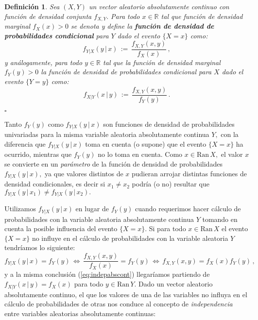 \documentclass[spanish,10pt,letterpaper]{article}
\newtheorem{defi}{Definición}
\newcommand{\Runo}{\mathbb{R}}
\newcommand{\qed}{\begin{flushright}$\square$\end{flushright}}
\begin{document}
\begin{defi}\label{def:fdpcond2}
    Sea $(X,Y)$ un vector aleatorio absolutamente continuo con función de densidad conjunta $f_{X,Y}.$ Para todo $x\in\Runo$ tal que función de densidad marginal $f_X(x)>0$ se denota y define la \textbf{función de densidad de probabilidades condicional} para $Y$ dado el evento $\{X=x\}$ como:
    $$f_{Y|X}(y\,|\,x) \,:=\, \frac{f_{X,Y}(x,y)}{f_X(x)}\,,$$
    y análogamente, para todo $y\in\Runo$ tal que la función de densidad marginal $f_Y(y)>0$ la función de densidad de probabilidades condicional para $X$ dado el evento $\{Y=y\}$ como:
    $$f_{X|Y}(x\,|\,y) \,:=\, \frac{f_{X,Y}(x,y)}{f_Y(y)}\,.$$ \qed
\end{defi}

Tanto $f_Y(y)$ como $f_{Y|X}(y\,|\,x)$ son funciones de densidad de probabilidades univariadas para la misma variable aleatoria absolutamente continua $Y,$ con la diferencia que $f_{Y|X}(y\,|\,x)$ toma en cuenta (o supone) que el evento $\{X=x\}$ ha ocurrido, mientras que $f_Y(y)$ no lo toma en cuenta. Como $x\in\text{Ran}\,X,$ el valor $x$ se convierte en un \textit{parámetro} de la función de densidad de probabilidades $f_{Y|X}(y\,|\,x),$ ya que valores distintos de $x$ pudieran arrojar distintas funciones de densidad condicionales, es decir si $x_1\neq x_2$ podría (o no) resultar que $f_{Y|X}(y\,|\,x_1)\neq f_{Y|X}(y\,|\,x_2).$

\medskip 

Utilizamos $f_{Y|X}(y\,|\,x)$ en lugar de $f_Y(y)$ cuando requerimos hacer cálculo de probabilidades con la variable aleatoria absolutamente continua $Y$ tomando en cuenta la posible influencia del evento $\{X=x\}.$ Si para todo $x\in\text{Ran}\,X$ el evento $\{X=x\}$ no influye en el cálculo de probabilidades con la variable aleatoria $Y$ tendríamos lo siguiente:
\begin{equation}\label{eq:indepabscont}
    f_{Y|X}(y\,|\,x) = f_Y(y) \,\Leftrightarrow\, \frac{f_{X,Y}(x,y)}{f_X(x)} = f_Y(y) \,\Leftrightarrow\, f_{X,Y}(x,y) = f_X(x)f_Y(y)\,,
\end{equation}
y a la misma conclusión (\ref{eq:indepabscont}) llegaríamos partiendo de $f_{X|Y}(x\,|\,y)=f_X(x)$ para todo $y\in\text{Ran}\,Y.$ Dado un vector aleatorio absolutamente continuo, el que los valores de una de las variables no influya en el cálculo de probabilidades de otras nos conduce al concepto de \textit{independencia} entre variables aleatorias absolutamente continuas: 

\bigskip 
\end{document}
